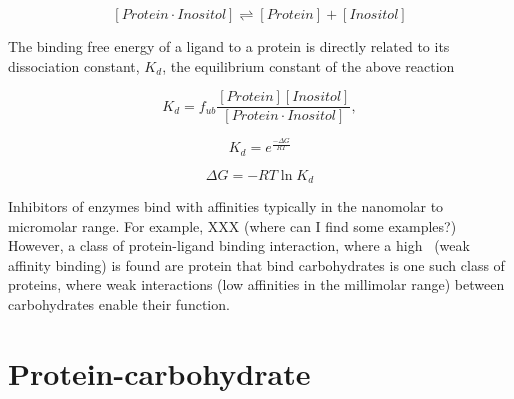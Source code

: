     \begin{equation}
      \left[ Protein\cdot Inositol \right] 
      \rightleftharpoons 
      \left[ Protein \right]+\left[ Inositol \right]
    \end{equation}
  
    
The binding free energy of a ligand to a protein is directly related to its dissociation constant, $K_d$, the equilibrium constant of the above reaction

    
     \begin{equation}
        K_{d} = f_{ub}\frac{\left[ Protein \right]\left[ Inositol \right]}{\left[Protein \cdot Inositol\right]},
     \end{equation}
     
     \begin{equation}
        K_{d} = e^{\frac{-\Delta G}{RT}}
     \end{equation}

     \begin{equation}
        \Delta G = -RT\ln K_d
     \end{equation}
     

Inhibitors of enzymes bind with affinities typically in the nanomolar to micromolar range.  For example, XXX (where can I find some examples?) However, a class of protein-ligand binding interaction, where a high \KD\ (weak affinity binding) is found are protein that bind carbohydrates is one such class of proteins, where weak interactions (low affinities in the millimolar range) between carbohydrates enable their function.

\section{Protein-carbohydrate}

